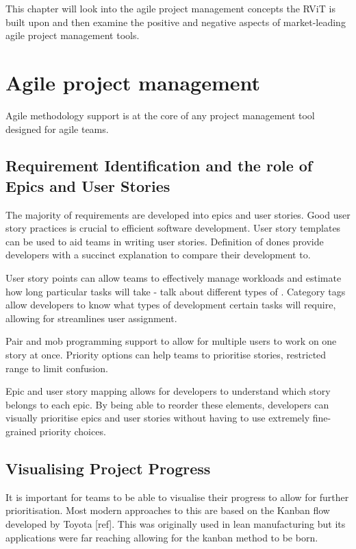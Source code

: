 \documentclass[l4proj.tex]{subfiles}
\begin{document}
    

This chapter will look into the agile project management concepts the RViT is built upon and then examine the positive and negative aspects of market-leading agile project management tools.

\section{Agile project management}
Agile methodology support is at the core of any project management tool designed for agile teams.

\subsection{Requirement Identification and the role of Epics and User Stories}
The majority of requirements are developed into epics and user stories. Good user story practices is crucial to efficient software development. User story templates can be used to aid teams in writing user stories. Definition of dones provide developers with a succinct explanation to compare their development to.

User story points can allow teams to effectively manage workloads and estimate how long particular tasks will take - talk about different types of . Category tags allow developers to know what types of development certain tasks will require, allowing for streamlines user assignment.

Pair and mob programming support to allow for multiple users to work on one story at once. Priority options can help teams to prioritise stories, restricted range to limit confusion. 

Epic and user story mapping allows for developers to understand which story belongs to each epic. By being able to reorder these elements, developers can visually prioritise epics and user stories without having to use extremely fine-grained priority choices.

\subsection{Visualising Project Progress}
It is important for teams to be able to visualise their progress to allow for further prioritisation. Most modern approaches to this are based on the Kanban flow developed by Toyota [ref]. This was originally used in lean manufacturing but its applications were far reaching allowing for the kanban method to be born. 
\end{document}
